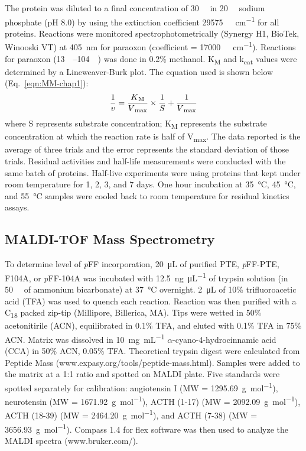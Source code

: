 \begin{refsection}
The protein was diluted to a final concentration of \SI{30}{\nano\Molar} in
\SI{20}{\milli\Molar} sodium phosphate (pH 8.0) by using the extinction
coefficient \SI{29575}{\per\Molar\per\cm} for all proteins\cite{Gasteiger2005,
Pace1995}.  Reactions were monitored spectrophotometrically (Synergy H1,
BioTek, Winooski VT) at \SI{405}{\nm} for paraoxon (coefficient =
\SI{17000}{\per\Molar\per\cm})\cite{Baker2011b}. Reactions for paraoxon
(\SIrange{13}{104}{\micro\Molar}) was done in 0.2\% methanol.
K\textsubscript{M} and k\textsubscript{cat} values were determined by a
Lineweaver-Burk plot.\cite{Baker2011b} The equation used is shown below
(Eq.~\ref{eqn:MM-chap1}): 
\begin{equation} 
    \frac{1}{v} =
    \frac{K\textsubscript{M}}{V\textsubscript{max}}\times\frac{1}{S} +
    \frac{1}{V\textsubscript{max}} 
    \label{eqn:MM-chap1}
\end{equation}
where S represents substrate concentration; K\textsubscript{M} represents the
substrate concentration at which the reaction rate is half of
V\textsubscript{max}. The data reported is the average of three trials and the
error represents the standard deviation of those trials. Residual activities
and half-life measurements were conducted with the same batch of proteins.
Half-live experiments were using proteins that kept under room temperature for
1, 2, 3, and 7 days. One hour incubation at \SI{35}{\celsius},
\SI{45}{\celsius}, and \SI{55}{\celsius} samples were cooled back to room
temperature for residual kinetics assays.  

\subsection{MALDI-TOF Mass Spectrometry}

To determine level of \emph{p}FF incorporation, \SI{20}{\micro\liter} of
purified PTE, \emph{p}FF-PTE, F104A, or \emph{p}FF-104A was incubated with
\SI{12.5}{\ng\per\uL} of trypsin solution (in \SI{50}{\milli\Molar} of ammonium
bicarbonate) at \SI{37}{\celsius} overnight. \SI{2}{\uL} of 10\%
trifluoroacetic acid (TFA) was used to quench each reaction. Reaction was then
purified with a C\textsubscript{18} packed zip-tip (Millipore, Billerica, MA).
Tips were wetted in 50\% acetonitirile (ACN), equilibrated in 0.1\% TFA, and
eluted with 0.1\% TFA in 75\% ACN. Matrix was dissolved in \SI{10}{\mg\per\mL}
$\alpha$-cyano-4-hydrocinnamic acid (CCA) in 50\% ACN, 0.05\% TFA. Theoretical
trypsin digest were calculated from Peptide Mass
(www.expasy.org/tools/peptide-mass.html). Samples were added to the matrix at a
1:1 ratio and spotted on MALDI plate. Five standards were spotted separately
for calibration: angiotensin I (MW = \SI{1295.69}{\g\per\mole}), neurotensin
(MW = \SI{1671.92}{\g\per\mole}), ACTH (1-17) (MW = \SI{2092.09}{\g\per\mole}),
ACTH (18-39) (MW = \SI{2464.20}{\g\per\mole}), and ACTH (7-38) (MW =
\SI{3656.93}{\g\per\mole}).  Compass 1.4 for flex software was then used to
analyze the MALDI spectra (www.bruker.com/).


\end{refsection}
